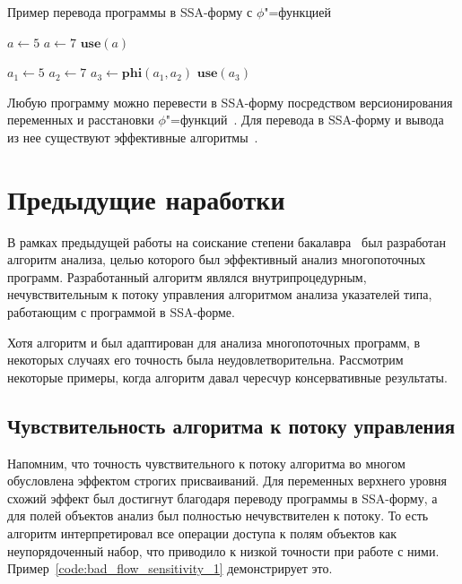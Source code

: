 \documentclass[14pt,titlepage,draft]{extarticle}
\newcommand{\java}{\eng{Java}\xspace}
\let\mathphi\phi
\renewcommand{\phi}{\ensuremath{\mathphi}}
\newcommand{\op}[1]{\mathbf{#1}}
\begin{document}
    \begin{algorithm}
      \caption{Пример перевода программы в SSA-форму с \phi"=функцией}
      \label{code:ssa_with_phi}
      \begin{multicols}{2}
        \begin{algorithmic}[1]
          \If{\ldots}
            \State $a \gets 5$
          \Else
            \State $a \gets 7$
          \EndIf
          \State $\op{use}(a)$
        \end{algorithmic}
        \columnbreak
        \begin{algorithmic}[1]
          \If{\ldots}
            \State $a_1 \gets 5$
          \Else
            \State $a_2 \gets 7$
          \EndIf
          \State $a_3 \gets \op{phi}(a_1, a_2)$
          \State $\op{use}(a_3)$
        \end{algorithmic}
      \end{multicols}
    \end{algorithm}

    Любую программу можно перевести в SSA-форму посредством
    версионирования переменных и расстановки \phi"=функций~\cite{ssa}.
    Для перевода в SSA-форму и вывода из нее существуют эффективные
    алгоритмы~\cite{bilardi_ssa, briggs_ssa}.

  \section{Предыдущие наработки}
    \label{section:previous_work}

    В рамках предыдущей работы на соискание степени
    бакалавра~\cite{my_bachelor} был разработан алгоритм анализа, целью
    которого был эффективный анализ многопоточных \java программ.
    Разработанный алгоритм являлся внутрипроцедурным, нечувствительным к
    потоку управления алгоритмом анализа указателей  типа,
    работающим с программой в SSA-форме.

    Хотя алгоритм и был адаптирован для анализа многопоточных программ, в
    некоторых случаях его точность была неудовлетворительна. Рассмотрим
    некоторые примеры, когда алгоритм давал чересчур консервативные
    результаты.

    \subsection{Чувствительность алгоритма к потоку управления}

      Напомним, что точность чувствительного к потоку алгоритма во многом
      обусловлена эффектом строгих присваиваний. Для переменных верхнего уровня
      схожий эффект был достигнут благодаря переводу программы в SSA-форму, а
      для полей объектов анализ был полностью нечувствителен к потоку. То есть
      алгоритм интерпретировал все операции доступа к полям объектов как
      неупорядоченный набор, что приводило к низкой точности при работе с ними.
      Пример~\ref{code:bad_flow_sensitivity_1} демонстрирует это.
\end{document}
